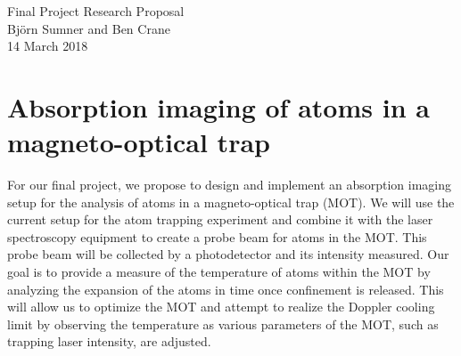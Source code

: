 \documentclass[12pt]{article}
\begin{document}
\begin{center}
{\Large Final Project Research Proposal} \\[.3in]
{\large Bj\"{o}rn Sumner and Ben Crane} \\
{14 March 2018}
\end{center}

\section*{Absorption imaging of atoms in a magneto-optical trap}

For our final project, we propose to design and implement an absorption imaging setup for the analysis of atoms in a magneto-optical trap (MOT).  We will use the current setup for the atom trapping experiment and combine it with the laser spectroscopy equipment to create a probe beam for atoms in the MOT.  This probe beam will be collected by a photodetector and its intensity measured.  Our goal is to provide a measure of the temperature of atoms within the MOT by analyzing the expansion of the atoms in time once confinement is released.  This will allow us to optimize the MOT and attempt to realize the Doppler cooling limit by observing the temperature as various parameters of the MOT, such as trapping laser intensity, are adjusted.
\end{document}

